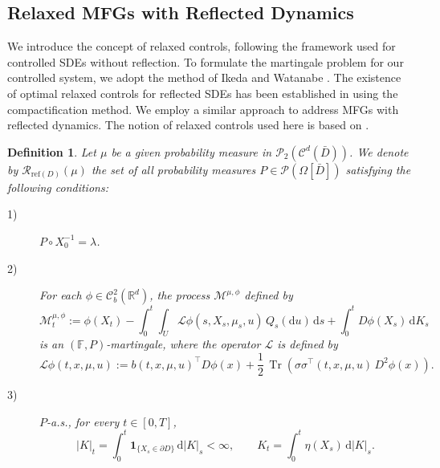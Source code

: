 \documentclass[11pt,amsfonts]{article}
\theoremstyle{plain}
\newtheorem{definition}{Definition}
\theoremstyle{assumpstyle}
\numberwithin{equation}{section}
\numberwithin{theorem}{section}
\numberwithin{proposition}{section}
\numberwithin{definition}{section}
\numberwithin{remark}{section}
\numberwithin{corollary}{section}
\numberwithin{lemma}{section}
\begin{document}
\subsection{Relaxed MFGs with Reflected Dynamics}
We introduce the concept of relaxed controls, following the framework used for controlled SDEs without reflection. To formulate the martingale problem for our controlled system, we adopt the method of Ikeda and Watanabe \cite{Ikeda}. The existence of optimal relaxed controls for reflected SDEs has been established in \cite{Kushner-Variance,Laayoun1} using the compactification method. We employ a similar approach to address MFGs with reflected dynamics. The notion of relaxed controls used here is based on \cite{Kushner-Variance}.
\begin{definition} \label{relaxed}
Let $\mu$ be a given probability measure in $\mathcal{P}_2(\mathcal{C}^d(\bar{D}))$.  
We denote by $\mathcal{R}_{\mathrm{ref}(D)}(\mu)$ the set of all probability measures 
$P \in \mathcal{P}(\Omega[\bar{D}])$ satisfying the following conditions:
\begin{description}
    \item[1)] $P \circ X_0^{-1} = \lambda$.
    \item[2)] For each $\phi \in \mathcal{C}^2_b(\mathbb{R}^d)$, the process 
    $\mathcal{M}^{\mu, \phi}$ defined by
    \begin{equation} \label{equ02.5}
        \mathcal{M}^{\mu, \phi}_t 
        := \phi(X_t) 
        - \int_0^t \int_U \mathcal{L}\phi(s, X_s, \mu_s, u)\, Q_s(\mathrm{d}u)\, \mathrm{d}s
        + \int_0^t D \phi(X_s)\, \mathrm{d}K_s
    \end{equation}
    is an $(\mathbb{F}, P)$-martingale, where the operator $\mathcal{L}$ is defined by
    \begin{equation*}
        \mathcal{L}\phi(t, x, \mu, u)
        := b(t, x, \mu, u)^\top D\phi(x)
        + \frac{1}{2}\, \operatorname{Tr}\!\left( 
        \sigma\sigma^\top(t, x, \mu, u)\, D^2\phi(x)
        \right).
    \end{equation*}
    
    \item[3)] $P$-a.s., for every $t \in [0,T]$,
    \begin{equation*}
    |K|_t = \int_0^t \mathbf{1}_{\{ X_s \in \partial D \}}\, \mathrm{d}|K|_s < \infty,
    \qquad 
    K_t = \int_0^t \eta(X_s)\, \mathrm{d}|K|_s.
    \end{equation*}
\end{description}
\end{definition}
\end{document}
